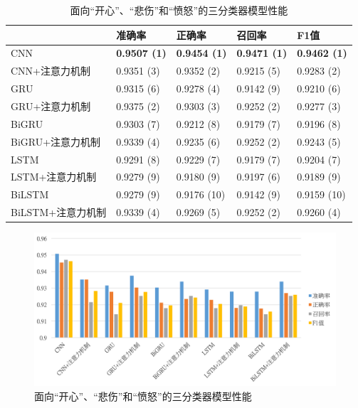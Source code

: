 \begin{table}[htb]
  \centering
  \begin{minipage}[t]{\linewidth}
  \caption{面向“开心”、“悲伤”和“愤怒”的三分类器模型性能}
  \label{tab:exp_context_emo_tri_result}
    \begin{tabularx}{\linewidth}{X|llll}
    \toprule[1.5pt]
    & 准确率 & 正确率 & 召回率 & F1值 \\
    \hline
    CNN & \bf 0.9507 (1) & \bf 0.9454 (1) & \bf 0.9471 (1) & \bf 0.9462 (1) \\ %
    CNN+注意力机制 & 0.9351 (3) & 0.9352 (2) & 0.9215 (5) & 0.9283 (2) \\ %
    \hline
    GRU & 0.9315 (6) & 0.9278 (4) & 0.9142 (9) & 0.9210 (6) \\ %
    GRU+注意力机制 & 0.9375 (2) & 0.9303 (3) & 0.9252 (2) & 0.9277 (3) \\ %
    \hline
    BiGRU & 0.9303 (7) & 0.9212 (8) & 0.9179 (7) & 0.9196 (8) \\ %
    BiGRU+注意力机制 & 0.9339 (4) & 0.9235 (6) & 0.9252 (2) & 0.9243 (5) \\ %
    \hline
    LSTM & 0.9291 (8) & 0.9229 (7) & 0.9179 (7) & 0.9204 (7) \\ %
    LSTM+注意力机制 & 0.9279 (9) & 0.9180 (9) & 0.9197 (6) & 0.9189 (9) \\ %
    \hline
    BiLSTM & 0.9279 (9) & 0.9176 (10) & 0.9142 (9) & 0.9159 (10) \\ %
    BiLSTM+注意力机制 & 0.9339 (4) & 0.9269 (5) & 0.9252 (2) & 0.9260 (4) \\ %
    \bottomrule[1.5pt]
    \end{tabularx}
  \end{minipage}
\end{table}

\begin{figure}[H]
  \centering
  \includegraphics[width=\textwidth]{img/exp_context_emo_tri_result_bar.png}
  \caption{面向“开心”、“悲伤”和“愤怒”的三分类器模型性能}
  \label{fig:exp_context_emo_tri_result_bar}
\end{figure}

